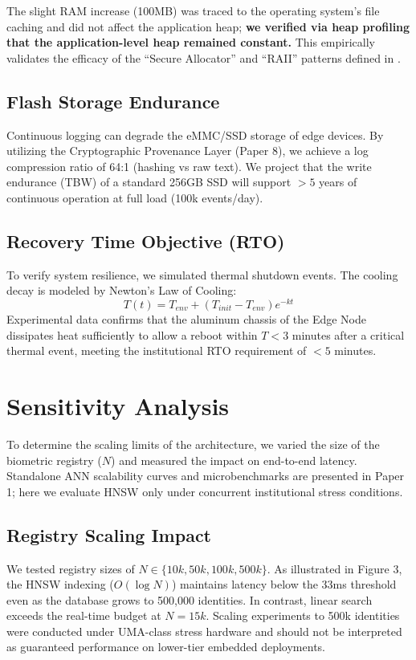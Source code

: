 \documentclass[conference]{IEEEtran}
\begin{document}
The slight RAM increase (100MB) was traced to the operating system's file caching and did not affect the application heap; \textbf{we verified via heap profiling that the application-level heap remained constant.} This empirically validates the efficacy of the ``Secure Allocator'' and ``RAII'' patterns defined in \cite{p3}.

\subsection{Flash Storage Endurance}
Continuous logging can degrade the eMMC/SSD storage of edge devices. By utilizing the Cryptographic Provenance Layer (Paper 8), we achieve a log compression ratio of 64:1 (hashing vs raw text). We project that the write endurance (TBW) of a standard 256GB SSD will support $>5$ years of continuous operation at full load (100k events/day).

\subsection{Recovery Time Objective (RTO)}
To verify system resilience, we simulated thermal shutdown events. The cooling decay is modeled by Newton's Law of Cooling:
\begin{equation}
T(t) = T_{env} + (T_{init} - T_{env}) e^{-kt}
\end{equation}
Experimental data confirms that the aluminum chassis of the Edge Node dissipates heat sufficiently to allow a reboot within $T < 3$ minutes after a critical thermal event, meeting the institutional RTO requirement of $<5$ minutes.

\section{Sensitivity Analysis}
To determine the scaling limits of the architecture, we varied the size of the biometric registry ($N$) and measured the impact on end-to-end latency. Standalone ANN scalability curves and microbenchmarks are presented in Paper 1; here we evaluate HNSW only under concurrent institutional stress conditions.

\subsection{Registry Scaling Impact}
We tested registry sizes of $N \in \{10k, 50k, 100k, 500k\}$.
As illustrated in Figure 3, the HNSW indexing ($O(\log N)$) maintains latency below the 33ms threshold even as the database grows to 500,000 identities. In contrast, linear search exceeds the real-time budget at $N=15k$. Scaling experiments to 500k identities were conducted under UMA-class stress hardware and should not be interpreted as guaranteed performance on lower-tier embedded deployments.
\end{document}
